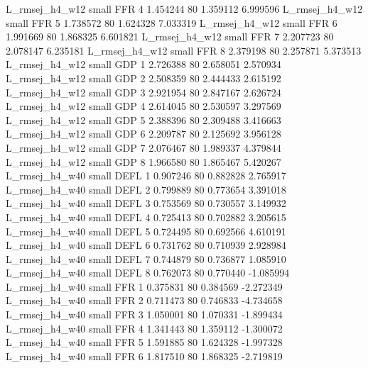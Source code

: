 L_rmsej_h4_w12      small      FFR                 4 1.454244 80       1.359112           6.999596
L_rmsej_h4_w12      small      FFR                 5 1.738572 80       1.624328           7.033319
L_rmsej_h4_w12      small      FFR                 6 1.991669 80       1.868325           6.601821
L_rmsej_h4_w12      small      FFR                 7 2.207723 80       2.078147           6.235181
L_rmsej_h4_w12      small      FFR                 8 2.379198 80       2.257871           5.373513
L_rmsej_h4_w12      small      GDP                 1 2.726388 80       2.658051           2.570934
L_rmsej_h4_w12      small      GDP                 2 2.508359 80       2.444433           2.615192
L_rmsej_h4_w12      small      GDP                 3 2.921954 80       2.847167           2.626724
L_rmsej_h4_w12      small      GDP                 4 2.614045 80       2.530597           3.297569
L_rmsej_h4_w12      small      GDP                 5 2.388396 80       2.309488           3.416663
L_rmsej_h4_w12      small      GDP                 6 2.209787 80       2.125692           3.956128
L_rmsej_h4_w12      small      GDP                 7 2.076467 80       1.989337           4.379844
L_rmsej_h4_w12      small      GDP                 8 1.966580 80       1.865467           5.420267
L_rmsej_h4_w40      small     DEFL                 1 0.907246 80       0.882828           2.765917
L_rmsej_h4_w40      small     DEFL                 2 0.799889 80       0.773654           3.391018
L_rmsej_h4_w40      small     DEFL                 3 0.753569 80       0.730557           3.149932
L_rmsej_h4_w40      small     DEFL                 4 0.725413 80       0.702882           3.205615
L_rmsej_h4_w40      small     DEFL                 5 0.724495 80       0.692566           4.610191
L_rmsej_h4_w40      small     DEFL                 6 0.731762 80       0.710939           2.928984
L_rmsej_h4_w40      small     DEFL                 7 0.744879 80       0.736877           1.085910
L_rmsej_h4_w40      small     DEFL                 8 0.762073 80       0.770440          -1.085994
L_rmsej_h4_w40      small      FFR                 1 0.375831 80       0.384569          -2.272349
L_rmsej_h4_w40      small      FFR                 2 0.711473 80       0.746833          -4.734658
L_rmsej_h4_w40      small      FFR                 3 1.050001 80       1.070331          -1.899434
L_rmsej_h4_w40      small      FFR                 4 1.341443 80       1.359112          -1.300072
L_rmsej_h4_w40      small      FFR                 5 1.591885 80       1.624328          -1.997328
L_rmsej_h4_w40      small      FFR                 6 1.817510 80       1.868325          -2.719819
